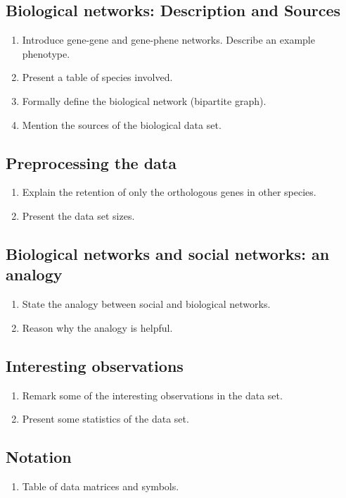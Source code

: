 \documentclass[11pt]{article}
\begin{document}
\subsection{Biological networks: Description and Sources}
\begin{enumerate}
\item Introduce gene-gene and gene-phene networks.
\subitem Describe an example phenotype.
\item Present a table of species involved.
\item Formally define the biological network (bipartite graph).
\item Mention the sources of the biological data set.
\end{enumerate}

\subsection{Preprocessing the data}
\begin{enumerate}
\item Explain the retention of only the orthologous genes in other species.
\item Present the data set sizes.
\end{enumerate}

\subsection{Biological networks and social networks: an analogy}
\begin{enumerate}
\item State the analogy between social and biological networks.
\item Reason why the analogy is helpful.
\end{enumerate}

\subsection{Interesting observations}
\begin{enumerate}
\item Remark some of the interesting observations in the data set.
\item Present some statistics of the data set.
\end{enumerate}

\subsection{Notation}
\begin{enumerate}
\item Table of data matrices and symbols.
\end{enumerate}
\end{document}
